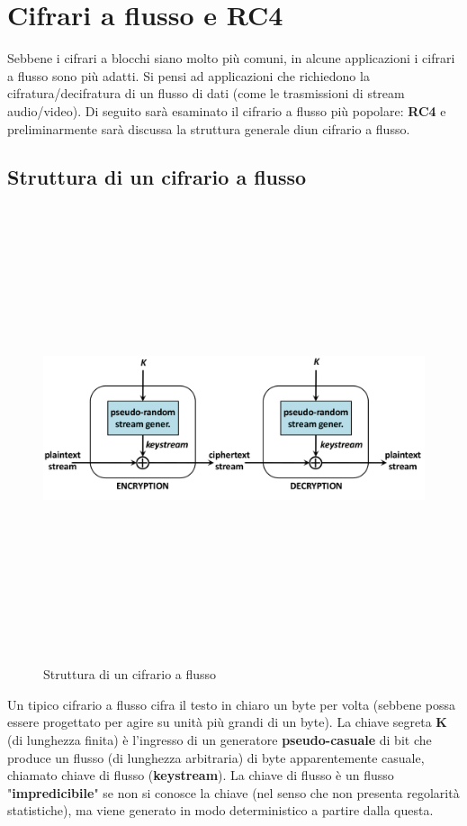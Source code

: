 \section{Cifrari a flusso e RC4}
Sebbene i cifrari a blocchi siano molto più comuni, in alcune applicazioni i cifrari a flusso sono più adatti. Si pensi ad applicazioni che richiedono la cifratura/decifratura di un flusso di dati (come le trasmissioni di stream audio/video). Di seguito sarà esaminato il cifrario a flusso più popolare: \textbf{RC4} e  preliminarmente sarà discussa la struttura generale diun cifrario a flusso.

\subsection{Struttura di un cifrario a flusso}
\begin{figure}[htbp]
	\centering%
	\subfigure%
	{\includegraphics[height=13cm, width=13cm, keepaspectratio]{Immagini/Capitolo2/flusso_struct.png}}
	\caption{Struttura di un cifrario a flusso \label{fig:flusso_struct}} 	
\end{figure}

Un tipico cifrario a flusso cifra il testo in chiaro un byte per volta (sebbene possa essere progettato per agire su unità più grandi di un byte). La chiave segreta \textbf{K} (di lunghezza finita) è l'ingresso di un generatore \textbf{pseudo-casuale} di bit che produce un flusso (di lunghezza arbitraria) di byte apparentemente casuale, chiamato chiave di flusso (\textbf{keystream}). La chiave di flusso è un flusso "\textbf{impredicibile}" se non si conosce la chiave (nel senso che non presenta regolarità statistiche), ma viene generato in modo deterministico a partire dalla questa. \\

